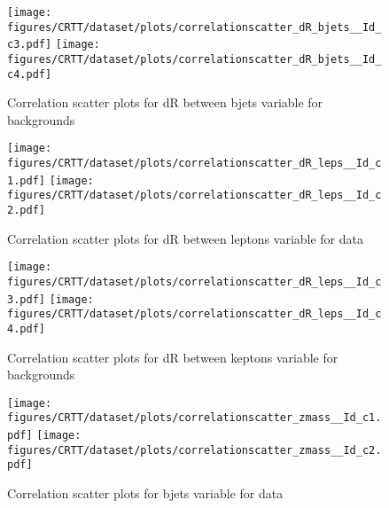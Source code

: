 \begin{figure}[!htb]%
\centering
\texttt{[image: figures/CRTT/dataset/plots/correlationscatter\_dR\_bjets\_\_Id\_c3.pdf]}
\texttt{[image: figures/CRTT/dataset/plots/correlationscatter\_dR\_bjets\_\_Id\_c4.pdf]}
\caption{ Correlation scatter plots for dR between bjets variable for backgrounds}%
\label{fig:correlations_CRTT_drbjets_BG}                                                       
\end{figure}\clearpage




\begin{figure}[!htb]%
\centering
\texttt{[image: figures/CRTT/dataset/plots/correlationscatter\_dR\_leps\_\_Id\_c1.pdf]}
\texttt{[image: figures/CRTT/dataset/plots/correlationscatter\_dR\_leps\_\_Id\_c2.pdf]}
\caption{ Correlation scatter plots for dR between leptons variable for data}%
\label{fig:correlations_CRTT_drleps_S}                                                       
\end{figure}\clearpage



\begin{figure}[!htb]%
\centering
\texttt{[image: figures/CRTT/dataset/plots/correlationscatter\_dR\_leps\_\_Id\_c3.pdf]}
\texttt{[image: figures/CRTT/dataset/plots/correlationscatter\_dR\_leps\_\_Id\_c4.pdf]}
\caption{ Correlation scatter plots for dR between keptons variable for backgrounds}%
\label{fig:correlations_CRTT_drleps_BG}                                                       
\end{figure}\clearpage



\begin{figure}[!htb]%
\centering
\texttt{[image: figures/CRTT/dataset/plots/correlationscatter\_zmass\_\_Id\_c1.pdf]}
\texttt{[image: figures/CRTT/dataset/plots/correlationscatter\_zmass\_\_Id\_c2.pdf]}
\caption{ Correlation scatter plots for \Zll bjets variable for data}%
\label{fig:correlations_CRTT_zmass_S}                                                       
\end{figure}\clearpage



